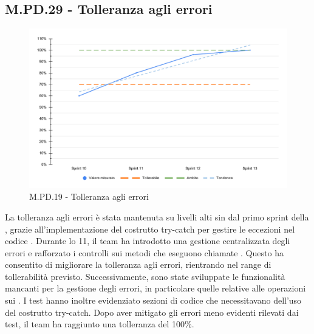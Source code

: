 \subsection{M.PD.29 - Tolleranza agli errori}

\begin{figure}[H]
  \centering
  \includegraphics[width=\textwidth]{assets/tolleranza_errori.pdf}
  \caption{M.PD.19 - Tolleranza agli errori}
\end{figure}

\par La tolleranza agli errori è stata mantenuta su livelli alti sin dal primo sprint della , grazie all'implementazione del costrutto try-catch per gestire le eccezioni nel codice . Durante lo  11, il team ha introdotto una gestione centralizzata degli errori e rafforzato i controlli sui metodi che eseguono chiamate . Questo ha consentito di migliorare la tolleranza agli errori, rientrando nel range di tollerabilità previsto. Successivamente, sono state sviluppate le funzionalità mancanti per la gestione degli errori, in particolare quelle relative alle operazioni  sui . I test hanno inoltre evidenziato sezioni di codice che necessitavano dell'uso del costrutto try-catch. Dopo aver mitigato gli errori meno evidenti rilevati dai test, il team ha raggiunto una tolleranza del 100\%.